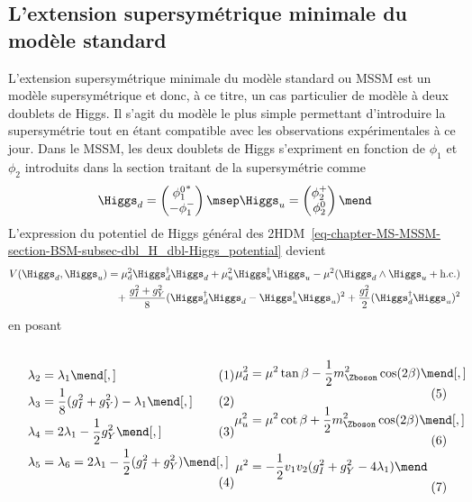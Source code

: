 \subsection{L'extension supersymétrique minimale du modèle standard}\label{chapter-MS-MSSM-section-BSM-subsec-MSSM}
L'extension supersymétrique minimale du modèle standard ou MSSM
est un modèle supersymétrique et donc, à ce titre, un cas particulier de modèle à deux doublets de Higgs.
Il s'agit du modèle le plus simple permettant d'introduire la supersymétrie tout en étant compatible avec les observations expérimentales à ce jour.
Dans le MSSM, les deux doublets de Higgs s'expriment en fonction de $\phi_1$ et $\phi_2$ introduits dans la section traitant de la supersymétrie comme~\cite{Higgs_hunter_guide}
\begin{equation}
\Higgs_d
=
\begin{pmatrix}
{\phi_1^0}^* \\ -\phi_1^-
\end{pmatrix}
\msep
\Higgs_u
=
\begin{pmatrix}
\phi_2^+ \\ \phi_2^0
\end{pmatrix}
\mend
\label{eq-chapter-MS-MSSM-section-BSM-Higgs_doublets}
\end{equation}
L'expression du potentiel de Higgs général des 2HDM~\eqref{eq-chapter-MS-MSSM-section-BSM-subsec-dbl_H_dbl-Higgs_potential} devient
\begin{align}
V(\Higgs_d,\Higgs_u)
&
=
\mu_d^2\Higgs_d^\dagger\Higgs_d
+
\mu_u^2\Higgs_u^\dagger\Higgs_u
-
\mu^2 (\Higgs_d\wedge\Higgs_u+\text{h.c.})
\nonumber\\
&\hphantom{=}
+
\frac{g_I^2+g_Y^2}{8} (\Higgs_d^\dagger\Higgs_d-\Higgs_u^\dagger\Higgs_u)^2
+
\frac{g_I^2}{2} (\Higgs_d^\dagger\Higgs_u)^2
\end{align}
en posant~\cite{Higgs_hunter_guide,Higgs_hunter_guide_errata,Nagashima_BSM}
\vspace{-.5\baselineskip}\par\noindent
\begin{subequations}
\noindent
\begin{minipage}[c]{.49\textwidth}
\begin{align}
\lambda_2 &= \lambda_1 \mend[,]\\
\lambda_3 &= \frac{1}{8} (g_I^2+g_Y^2)-\lambda_1 \mend[,]\\
\lambda_4 &= 2\lambda_1 - \frac{1}{2} g_Y^2 \mend[,]\\
\lambda_5 &= \lambda_6 = 2\lambda_1 - \frac{1}{2}(g_I^2+g_Y^2) \mend[,]
\end{align}
\end{minipage}
\hfill
\begin{minipage}[c]{.49\textwidth}
\begin{align}
\mu_d^2 &= \mu^2\tan\beta - \frac{1}{2} m_{\Zboson}^2 \cos(2\beta) \mend[,]\\
\mu_u^2 &= \mu^2\cot\beta + \frac{1}{2} m_{\Zboson}^2 \cos(2\beta) \mend[,]\\
\mu^2 &= -\frac{1}{2}v_1v_2(g_I^2+g_Y^2-4\lambda_1)
\mend
\end{align}
\end{minipage}
\end{subequations}
